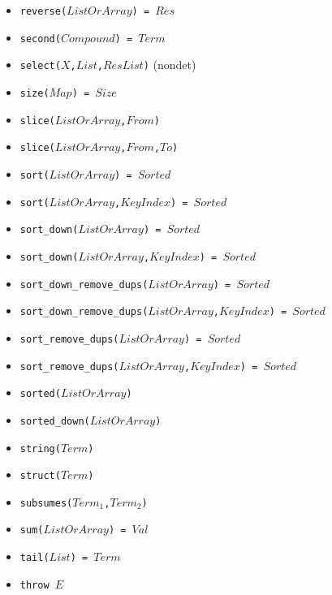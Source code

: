 \documentclass[10pt]{article}
\begin{document}
\begin{multicols}{2}
\begin{scriptsize}
\begin{itemize}
    \item \texttt{reverse($ListOrArray$) = $Res$} 
    \item \texttt{second($Compound$) = $Term$} 
    \item \texttt{select($X$,$List$,$ResList$)} (nondet)
    \item \texttt{size($Map$) = $Size$}
    \item \texttt{slice($ListOrArray$,$From$)}
    \item \texttt{slice($ListOrArray$,$From$,$To$)}
    \item \texttt{sort($ListOrArray$) = $Sorted$} 
    \item \texttt{sort($ListOrArray$,$KeyIndex$) = $Sorted$} 
    \item \texttt{sort\_down($ListOrArray$) = $Sorted$} 
    \item \texttt{sort\_down($ListOrArray$,$KeyIndex$) = $Sorted$} 
    \item \texttt{sort\_down\_remove\_dups($ListOrArray$) = $Sorted$} 
    \item \texttt{sort\_down\_remove\_dups($ListOrArray$,$KeyIndex$) = $Sorted$} 
    \item \texttt{sort\_remove\_dups($ListOrArray$) = $Sorted$} 
    \item \texttt{sort\_remove\_dups($ListOrArray$,$KeyIndex$) = $Sorted$} 
    \item \texttt{sorted($ListOrArray$)} 
    \item \texttt{sorted\_down($ListOrArray$)} 
    \item \texttt{string($Term$)} 
    \item \texttt{struct($Term$)} 
    \item \texttt{subsumes($Term_1$,$Term_2$)}
    \item \texttt{sum($ListOrArray$) = $Val$}
    \item \texttt{tail($List$) = $Term$} 
    \item \texttt{throw $E$}    

\end{itemize}
\end{scriptsize}
\end{multicols}
\end{document}

